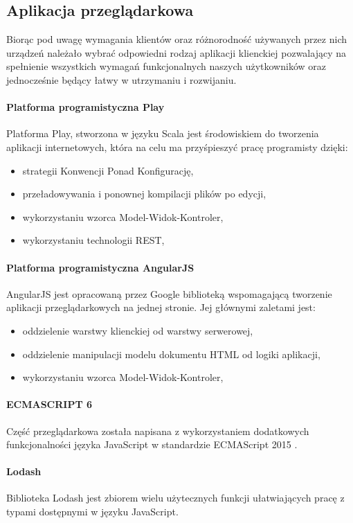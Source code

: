 \documentclass[a4paper,12pt,twoside]{article}
\begin{document}
\subsection{Aplikacja przeglądarkowa}
Biorąc pod uwagę wymagania klientów oraz różnorodność używanych przez nich urządzeń należało wybrać odpowiedni rodzaj aplikacji klienckiej pozwalający na spełnienie wszystkich wymagań funkcjonalnych naszych użytkowników
oraz jednocześnie będący łatwy w utrzymaniu i rozwijaniu.

\paragraph{Platforma programistyczna Play}
Platforma Play, stworzona w języku Scala jest środowiskiem
do tworzenia aplikacji internetowych,
która na celu ma przyśpieszyć pracę programisty dzięki:
\begin{itemize}
\item strategii Konwencji Ponad Konfigurację,
\item przeładowywania i ponownej kompilacji plików po edycji,
\item wykorzystaniu wzorca Model-Widok-Kontroler,
\item wykorzystaniu technologii REST,
\end{itemize}

\paragraph{Platforma programistyczna AngularJS}
AngularJS jest opracowaną przez Google biblioteką wspomagającą tworzenie
aplikacji przeglądarkowych na jednej stronie. Jej głównymi zaletami jest:
\begin{itemize}
\item oddzielenie warstwy klienckiej od warstwy serwerowej,
\item oddzielenie manipulacji modelu dokumentu HTML od logiki aplikacji,
\item wykorzystaniu wzorca Model-Widok-Kontroler,
\end{itemize}

\paragraph{ECMASCRIPT 6} Część przeglądarkowa została napisana z wykorzystaniem
dodatkowych funkcjonalności języka JavaScript w standardzie ECMAScript 2015 \cite{ecma}.

\paragraph{Lodash} Biblioteka Lodash \cite{lodash} jest zbiorem wielu użytecznych funkcji ułatwiających pracę z typami dostępnymi w języku JavaScript.
\end{document}

